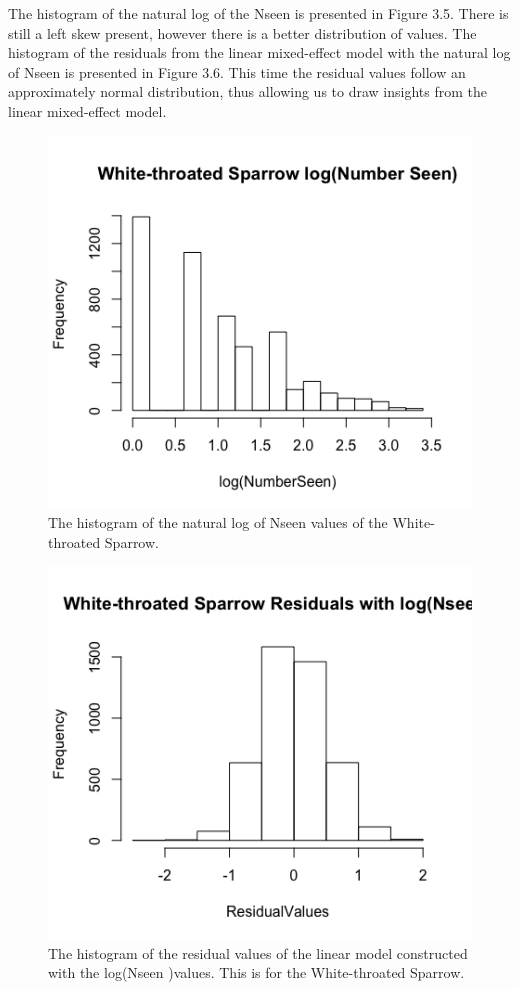 The histogram of the natural log of the Nseen is presented in Figure 3.5. There is still a left skew present, however there is a better distribution of values. The histogram of the residuals from the linear mixed-effect model with the natural log of Nseen is presented in Figure 3.6. This time the residual values follow an approximately normal distribution, thus allowing us to draw insights from the linear mixed-effect model.

\begin{figure}[h]
\centering
\includegraphics[width=12cm]{figures/WhiteSparrowlogNseen.png}
\caption{The histogram of the natural log of Nseen values of the White-throated Sparrow.}
\end{figure}

\begin{figure}[h]
\centering
\includegraphics[width=12cm]{figures/WSResidlog.png}
\caption{The histogram of the residual values of the linear model constructed with the log(Nseen )values. This is for the White-throated Sparrow.}
\end{figure}

